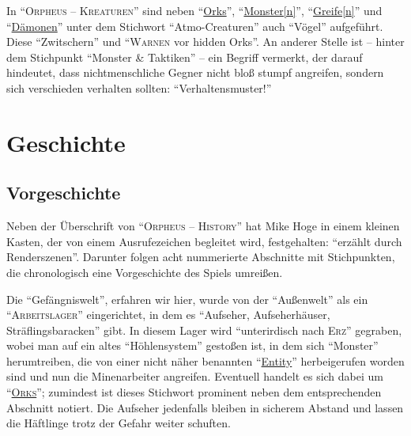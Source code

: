 \documentclass[a5paper,pagesize,numbers=noenddot]{scrbook}
\begin{document}
In \enquote{\textsc{Orpheus -- Kreaturen}} sind neben \enquote{\uline{Orks}}, \enquote{\uline{Monster[n]}}, \enquote{\uline{Greife[n]}} und \enquote{\uline{Dämonen}} unter dem Stichwort \enquote{Atmo-Creaturen} auch \enquote{Vögel} aufgeführt.
Diese \enquote{Zwitschern} und \enquote{\textsc{Warnen} vor hidden Orks}.
An anderer Stelle ist -- hinter dem Stichpunkt \enquote{Monster \&  Taktiken} -- ein Begriff vermerkt, der darauf hindeutet, dass nichtmenschliche Gegner nicht bloß stumpf angreifen, sondern sich verschieden verhalten sollten: \enquote{Verhaltensmuster!}\autocite[S.~8]{orpheus_b_scribbles}


\clearpage
\section{Geschichte}\label{sec:orpheus_geschichte}


\subsection{Vorgeschichte}\label{sec:orpheus_geschichte_vorgeschichte}
Neben der Überschrift von \enquote{\textsc{Orpheus -- History}} hat Mike Hoge in einem kleinen Kasten, der von einem Ausrufezeichen begleitet wird, festgehalten:
\enquote{erzählt durch Renderszenen}.
Darunter folgen acht nummerierte Abschnitte mit Stichpunkten, die chronologisch eine Vorgeschichte des Spiels umreißen.

Die \enquote{Gefängniswelt}, erfahren wir hier, wurde von der \enquote{Außenwelt} als ein \enquote{\textsc{Arbeitslager}} eingerichtet, in dem es \enquote{Aufseher, Aufseherhäuser, Sträflingsbaracken} gibt.
In diesem Lager wird \enquote{unterirdisch nach \textsc{Erz}} gegraben, wobei man auf ein altes \enquote{Höhlensystem} gestoßen ist, in dem sich \enquote{Monster} herumtreiben, die von einer nicht näher benannten \enquote{\uline{Entity}} herbeigerufen worden sind und nun die Minenarbeiter angreifen.
Eventuell handelt es sich dabei um \enquote{\textsc{\uline{Orks}}}; zumindest ist dieses Stichwort prominent neben dem entsprechenden Abschnitt notiert.
Die Aufseher jedenfalls bleiben in sicherem Abstand und lassen die Häftlinge trotz der Gefahr weiter schuften.
\end{document}
